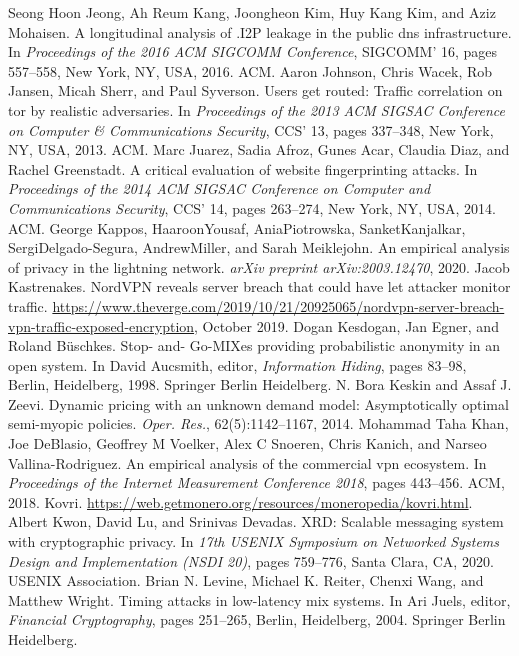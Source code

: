 \documentclass{article}
\begin{document}
\begin{thebibliography}{200}
Seong Hoon Jeong, Ah Reum Kang, Joongheon Kim, Huy Kang Kim, and Aziz Mohaisen. A longitudinal analysis of .I2P leakage in the public dns infrastructure. In \emph{Proceedings of the 2016 ACM SIGCOMM Conference}, SIGCOMM' 16, pages 557–558, New York, NY, USA, 2016. ACM.
Aaron Johnson, Chris Wacek, Rob Jansen, Micah Sherr, and Paul Syverson. Users get routed: Traffic correlation on tor by realistic adversaries. In \emph{Proceedings of the 2013 ACM SIGSAC Conference on Computer \& Communications Security}, CCS’ 13, pages 337–348, New York, NY, USA, 2013. ACM.
Marc Juarez, Sadia Afroz, Gunes Acar, Claudia Diaz, and Rachel Greenstadt. A critical evaluation of website fingerprinting attacks. In \emph{Proceedings of the 2014 ACM SIGSAC Conference on Computer and Communications Security}, CCS’ 14, pages 263–274, New York, NY, USA, 2014. ACM.
George Kappos, HaaroonYousaf, AniaPiotrowska, SanketKanjalkar, SergiDelgado-Segura, AndrewMiller, and Sarah Meiklejohn. An empirical analysis of privacy in the lightning network. \emph{arXiv preprint arXiv:2003.12470}, 2020.
Jacob Kastrenakes. NordVPN reveals server breach that could have let attacker monitor traffic. \url{https://www.theverge.com/2019/10/21/20925065/nordvpn-server-breach-vpn-traffic-exposed-encryption}, October 2019.
Dogan Kesdogan, Jan Egner, and Roland Büschkes. Stop- and- Go-MIXes providing probabilistic anonymity in an open system. In David Aucsmith, editor, \emph{Information Hiding}, pages 83–98, Berlin, Heidelberg, 1998. Springer Berlin Heidelberg.
N. Bora Keskin and Assaf J. Zeevi. Dynamic pricing with an unknown demand model: Asymptotically optimal semi-myopic policies. \emph{Oper. Res.}, 62(5):1142–1167, 2014.
Mohammad Taha Khan, Joe DeBlasio, Geoffrey M Voelker, Alex C Snoeren, Chris Kanich, and Narseo Vallina-Rodriguez. An empirical analysis of the commercial vpn ecosystem. In \emph{Proceedings of the Internet Measurement Conference 2018}, pages 443–456. ACM, 2018.
Kovri. \url{https://web.getmonero.org/resources/moneropedia/kovri.html}.
Albert Kwon, David Lu, and Srinivas Devadas. XRD: Scalable messaging system with cryptographic privacy. In \emph{17th USENIX Symposium on Networked Systems Design and Implementation (NSDI 20)}, pages 759–776, Santa Clara, CA, 2020. USENIX Association.
Brian N. Levine, Michael K. Reiter, Chenxi Wang, and Matthew Wright. Timing attacks in low-latency mix systems. In Ari Juels, editor, \emph{Financial Cryptography}, pages 251–265, Berlin, Heidelberg, 2004. Springer Berlin Heidelberg.

\end{thebibliography}
\end{document}
